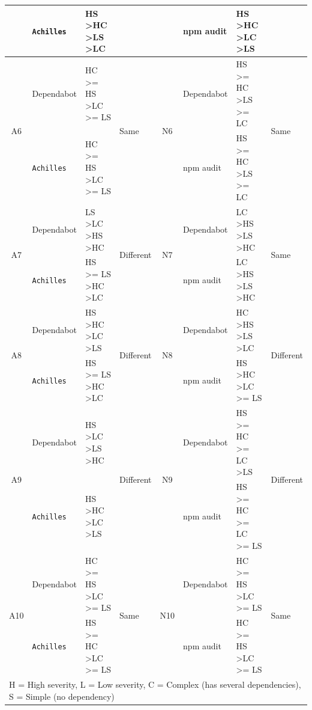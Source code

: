 \documentclass[conference]{IEEEtran}
\begin{document}
\begin{table}
\begin{tabular}{clll|clll}
			& \texttt{Achilles}      & HS \textgreater HC \textgreater LS \textgreater LC       & & & npm audit & HS \textgreater HC \textgreater LC \textgreater LS & \\ \midrule
			\multirow{2}{*}{A6}   & Dependabot    & HC \textgreater{}= HS \textgreater LC \textgreater{}= LS & \multirow{2}{*}{Same} & \multirow{2}{*}{N6} & Dependabot & HS \textgreater{}= HC \textgreater LS \textgreater{}= LC & \multirow{2}{*}{Same} \\ 
			& \texttt{Achilles}      & HC \textgreater{}= HS \textgreater LC \textgreater{}= LS & & & npm audit & HS \textgreater{}= HC \textgreater LS \textgreater{}= LC & \\ \midrule
			\multirow{2}{*}{A7}   & Dependabot    & LS \textgreater LC \textgreater HS \textgreater HC       & \multirow{2}{*}{Different} & \multirow{2}{*}{N7} & Dependabot & LC \textgreater HS \textgreater LS \textgreater HC& \multirow{2}{*}{Same} \\ 
			& \texttt{Achilles}      & HS \textgreater{}= LS \textgreater HC \textgreater LC    & & & npm audit & LC \textgreater HS \textgreater LS \textgreater HC& \\ \midrule
			\multirow{2}{*}{A8}   & Dependabot    & HS \textgreater HC \textgreater LC \textgreater LS       & \multirow{2}{*}{Different} & \multirow{2}{*}{N8}  & Dependabot & HC \textgreater HS \textgreater LS \textgreater LC & \multirow{2}{*}{Different} \\ 
			& \texttt{Achilles}      & HS \textgreater{}= LS \textgreater HC \textgreater LC    & & & npm audit & HS \textgreater HC \textgreater LC \textgreater{}= LS & \\ \midrule
			\multirow{2}{*}{A9}   & Dependabot    & HS \textgreater LC \textgreater LS \textgreater HC       & \multirow{2}{*}{Different} & \multirow{2}{*}{N9} & Dependabot & HS \textgreater{}= HC \textgreater{}= LC \textgreater LS  & \multirow{2}{*}{Different} \\ 
			& \texttt{Achilles}      & HS \textgreater HC \textgreater LC \textgreater LS       & & & npm audit & HS \textgreater{}= HC \textgreater{}= LC \textgreater{}= LS & \\ \midrule
			\multirow{2}{*}{A10}  & Dependabot    & HC \textgreater{}= HS \textgreater LC \textgreater{}= LS & \multirow{2}{*}{Same} & \multirow{2}{*}{N10} & Dependabot & HC \textgreater{}= HS \textgreater LC \textgreater{}= LS & \multirow{2}{*}{Same} \\ 
			& \texttt{Achilles}      & HS \textgreater{}= HC \textgreater LC \textgreater{}= LS & & & npm audit & HC \textgreater{}= HS \textgreater LC \textgreater{}= LS & \\ \midrule
			\multicolumn{8}{l}{H = High severity, L = Low severity, C = Complex (has several dependencies), S = Simple (no dependency)} \\
		\end{tabular}
		\label{table:result-Ach-t1}
	\end{table}
	
\end{document}

